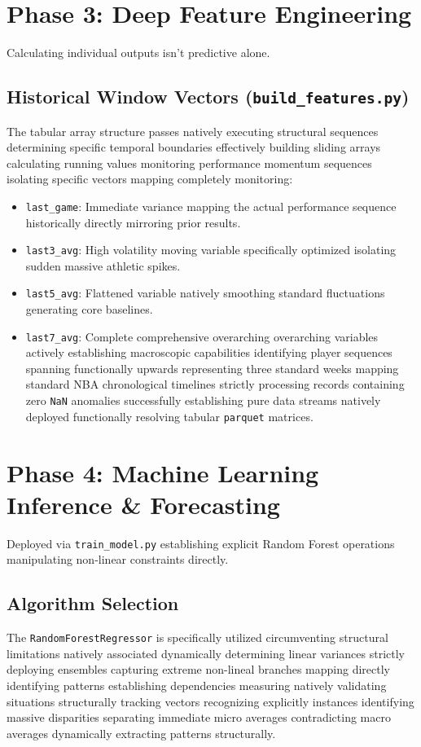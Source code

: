 \documentclass[12pt,a4paper]{article}
\begin{document}
\section{Phase 3: Deep Feature Engineering}
Calculating individual outputs isn't predictive alone.

\subsection{Historical Window Vectors (\texttt{build\_features.py})}
The tabular array structure passes natively executing structural sequences determining specific temporal boundaries effectively building sliding arrays calculating running values monitoring performance momentum sequences isolating specific vectors mapping completely monitoring:
\begin{itemize}
    \item \texttt{last\_game}: Immediate variance mapping the actual performance sequence historically directly mirroring prior results.
    \item \texttt{last3\_avg}: High volatility moving variable specifically optimized isolating sudden massive athletic spikes.
    \item \texttt{last5\_avg}: Flattened variable natively smoothing standard fluctuations generating core baselines.
    \item \texttt{last7\_avg}: Complete comprehensive overarching overarching variables actively establishing macroscopic capabilities identifying player sequences spanning functionally upwards representing three standard weeks mapping standard NBA chronological timelines strictly processing records containing zero \texttt{NaN} anomalies successfully establishing pure data streams natively deployed functionally resolving tabular \texttt{parquet} matrices. 
\end{itemize}

\section{Phase 4: Machine Learning Inference \& Forecasting}
Deployed via \texttt{train\_model.py} establishing explicit Random Forest operations manipulating non-linear constraints directly. 

\subsection{Algorithm Selection}
The \texttt{RandomForestRegressor} is specifically utilized circumventing structural limitations natively associated dynamically determining linear variances strictly deploying ensembles capturing extreme non-lineal branches mapping directly identifying patterns establishing dependencies measuring natively validating situations structurally tracking vectors recognizing explicitly instances identifying massive disparities separating immediate micro averages contradicting macro averages dynamically extracting patterns structurally. 
\end{document}
